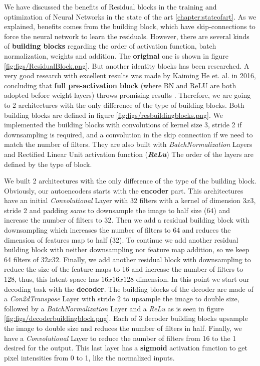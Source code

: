 We have discussed the benefits of Residual blocks in the training and optimization of Neural Networks in the state of the art \ref{chapter:stateofart}. As we explained, benefits comes from the building block, which have skip-connections to force the neural network to learn the residuals. However, there are several kinds of \textbf{building blocks} regarding the order of activation function, batch normalization, weights and addition. The \textbf{original} one is shown in figure \ref{fig:figs/ResidualBlock.png}. But another identity blocks has been researched. A very good research with excellent results was made by Kaiming He et. al. in 2016, concluding that \textbf{full pre-activation block} (where BN and ReLU are both adopted before weight layers) throws promising results \cite{identityblocksmicrosoft}. Therefore, we are going to 2 architectures with the only difference of the type of building blocks. Both building blocks are defined in figure \ref{fig:figs/resbuildingblocks.png}. We implemented the building blocks with convolutions of kernel size 3, stride 2 if downsampling is required, and a convolution in the skip connection if we need to match the number of filters. They are also built with \textit{BatchNormalization} Layers and Rectified Linear Unit activation function (\textbf{\textit{ReLu}}) The order of the layers are defined by the type of block.

We built 2 architectures with the only difference of the type of the building block. Obviously, our autoencoders starts with the \textbf{encoder} part. This architectures have an initial \textit{Convolutional} Layer with 32 filters with a kernel of dimension $3x3$, stride 2 and padding \textit{same} to downsample the image to half size (64) and increase the number of filters to 32. Then we add a residual building block with downsampling which increases the number of filters to 64 and reduces the dimension of features map to half (32). To continue we add another residual building block with neither downsampling nor feature map addition, so we keep 64 filters of $32x32$. Finally, we add another residual block with downsampling to reduce the size of the feature maps to 16 and increase the number of filters to 128, thus, this latent space has $16x16x128$ dimension. In this point we start our decoding task with the \textbf{decoder}. The building blocks of the decoder are made of a \textit{Con2dTranspose} Layer with stride 2 to upsample the image to double size, followed by a \textit{BatchNormalization} Layer and a \textit{ReLu} as is seen in figure \ref{fig:figs/decoderbuildingblock.png}. Each of 3 decoder building blocks upsample the image to double size and reduces the number of filters in half. Finally, we have a \textit{Convolutional} Layer to reduce the number of filters from 16 to the 1 desired for the output. This last layer has a \textbf{sigmoid} activation function to get pixel intensities from 0 to 1, like the normalized inputs.

